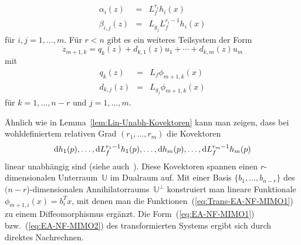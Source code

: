 \begin{theorem}
\[\begin{array}{lcl}
\alpha_{i}(z) & = & L_{f}^{r_{i}}h_{i}(x)\\
\beta_{i,j}(z) & = & L_{g_{j}}L_{f}^{r_{i}-1}h_{i}(x)
\end{array}
\]
für $i,j=1,\ldots,m$. Für $r<n$ gibt es ein weiteres Teilsystem
der Form
\begin{equation}
\dot{z}_{m+1,k}=q_{k}(z)+d_{k,1}(z)u_{1}+\cdots+d_{k,m}(z)u_{m}\label{eq:EA-NF-MIMO2}
\end{equation}
mit 
\[
\begin{array}{lcl}
q_{k}(z) & = & L_{f}\phi_{m+1,k}(x)\\
d_{k,j}(z) & = & L_{g_{j}}\phi_{m+1,k}(x)
\end{array}
\]
für $k=1,\ldots,n-r$ und $j=1,\ldots,m$.
\end{theorem}
\begin{proofsketch}Ähnlich wie in Lemma~\ref{lem:Lin-Unabh-Kovektoren}
kann man zeigen, dass bei wohldefiniertem relativen Grad $(r_{1},\ldots,r_{m})$
die Kovektoren
\[
{\mathrm{d}} h_{1}(p),\ldots,{\mathrm{d}} L_{f}^{r_{1}-1}h_{1}(p),\ldots,{\mathrm{d}} h_{m}(p),\ldots,{\mathrm{d}} L_{f}^{r_{m}-1}h_{m}(p)
\]
linear unabhängig sind (siehe auch~\cite[Lemma~{5.1.1}]{isidori3}).
Diese Kovektoren spannen einen $r$-dimensionalen Unterraum~$\mathbb{U}$
im Dualraum auf. Mit einer Basis $\{b_{1},\ldots,b_{n-r}\}$ des $(n-r$)-dimensionalen
Annihilatorraums~$\mathbb{U}^{\perp}$ konstruiert
man lineare Funktionale $\phi_{m+1,i}(x)=b_{i}^{T}x$, mit denen man
die Funktionen~(\ref{eq:Trans-EA-NF-MIMO1}) zu einem Diffeomorphismus
ergänzt. Die Form~(\ref{eq:EA-NF-MIMO1}) bzw.~(\ref{eq:EA-NF-MIMO2})
des transformierten Systems ergibt sich durch direktes Nachrechnen.
\end{proofsketch}


